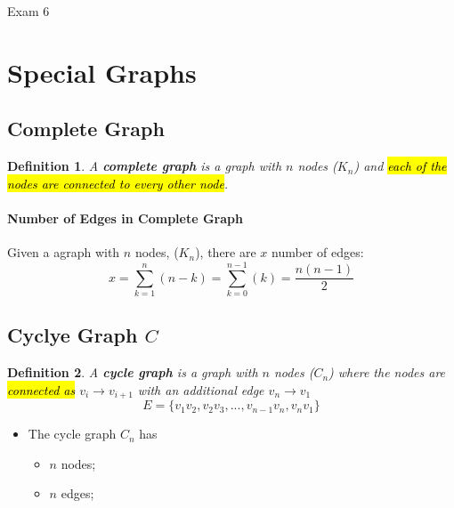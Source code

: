 \documentclass{note}
\newtheorem{definition}{Definition}
\begin{document}
\begin{note}{Exam 6}
        \section{Special Graphs}

        \subsection{Complete Graph}

        \begin{definition}
            A \textbf{complete graph} is a graph with $ n $ nodes ($ K_{n} $) and \hl{each of the nodes are connected to every other node}.
        \end{definition}

        \paragraph{Number of Edges in Complete Graph} Given a agraph with $ n $ nodes, ($ K_{n} $), there are $ x $ number of edges:
        \begin{equation}
            x = \sum_{k = 1}^{n} \left( n - k \right) = \sum_{k = 0}^{n - 1} \left( k \right) = \frac{n \left(n - 1 \right)}{2}
        \end{equation}

        \subsection{Cyclye Graph $ C $}

        \begin{definition}
            A \textbf{cycle graph} is a graph with $ n $ nodes ($ C_{n} $) where the nodes are \hl{connected as} $ v_{i} \to v_{i + 1} $
            with an additional edge $ v_{n} \to v_{1} $
            \begin{equation}\label{eq: cycle graphs}
                E = \{ v_{1}v_{2}, v_{2}v_{3}, ... , v_{n-1}v_{n}, v_{n}v_{1} \}
            \end{equation}
        \end{definition}

        \begin{itemize}
            \item The cycle graph $ C_{n} $ has
            \begin{itemize}
                \item $ n $ nodes;
                \item $ n $ edges;
            \end{itemize}
        \end{itemize}


\end{note}
\end{document}
